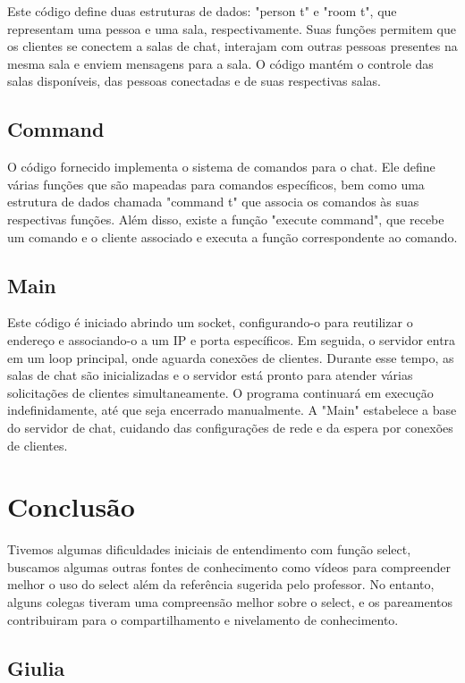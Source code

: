 \documentclass[a4paper]{article}
\begin{document}
Este código define duas estruturas de dados: "person t" e "room t", que representam uma pessoa e uma sala, respectivamente. Suas funções permitem que os clientes se conectem a salas de chat, interajam com outras pessoas presentes na mesma sala e enviem mensagens para a sala. O código mantém o controle das salas disponíveis, das pessoas conectadas e de suas respectivas salas.

\subsection{Command}

O código fornecido implementa o sistema de comandos para o chat. Ele define várias funções que são mapeadas para comandos específicos, bem como uma estrutura de dados chamada "command t" que associa os comandos às suas respectivas funções. Além disso, existe a função "execute command", que recebe um comando e o cliente associado e executa a função correspondente ao comando.

\subsection{Main}

Este código é iniciado abrindo um socket, configurando-o para reutilizar o endereço e associando-o a um IP e porta específicos. Em seguida, o servidor entra em um loop principal, onde aguarda conexões de clientes. Durante esse tempo, as salas de chat são inicializadas e o servidor está pronto para atender várias solicitações de clientes simultaneamente. O programa continuará em execução indefinidamente, até que seja encerrado manualmente. A "Main" estabelece a base do servidor de chat, cuidando das configurações de rede e da espera por conexões de clientes.

\section{Conclusão}

Tivemos algumas dificuldades iniciais de entendimento com função select, buscamos algumas outras fontes de conhecimento como vídeos para compreender melhor o uso do select além da referência sugerida pelo professor. No entanto, alguns colegas tiveram uma compreensão melhor sobre o select, e os pareamentos contribuiram para o compartilhamento e nivelamento de conhecimento.

\subsection{Giulia}
\end{document}
